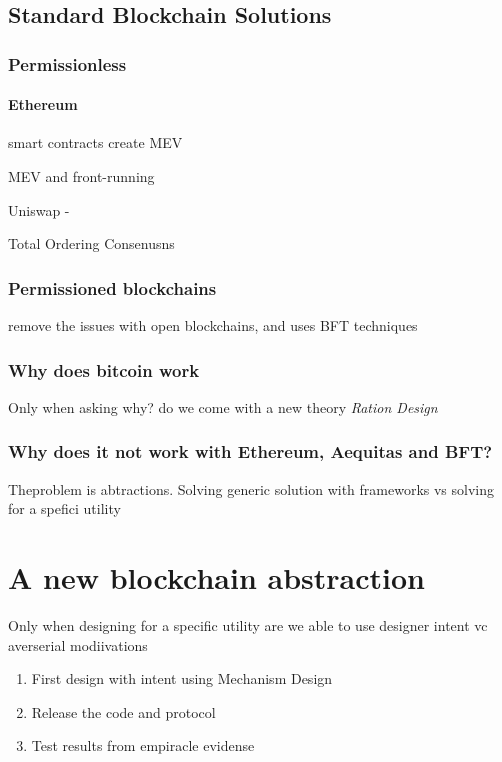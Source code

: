 \documentclass[12pt]{article}
\begin{document}
\subsection{Standard Blockchain Solutions} 

\subsubsection{Permissionless} 

\paragraph*{Ethereum} smart contracts create MEV

MEV and front-running 

Uniswap - 

Total Ordering Consenusns 

\subsubsection{Permissioned blockchains} remove the issues with open blockchains, and uses BFT techniques 


\subsubsection{Why does bitcoin work} 
Only when asking why? do we come with a new theory \emph{Ration Design}

\subsubsection{Why does it not work with Ethereum, Aequitas and BFT?}
Theproblem is abtractions. Solving generic solution with frameworks vs solving for a spefici utility 

\section{A new blockchain abstraction} 
Only when designing for a specific utility are we able to use designer intent vc averserial modiivations 

\begin{enumerate}
    \item First design with intent using Mechanism Design 
    \item Release the code and protocol
    \item Test results from empiracle evidense 
\end{enumerate}
\end{document}
